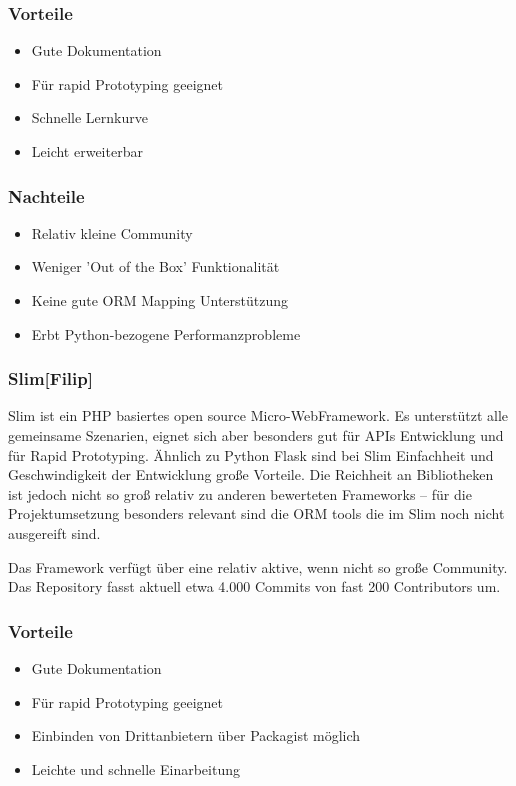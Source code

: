\subsubsection*{Vorteile}
\begin{itemize}
    \item Gute Dokumentation
    \item Für rapid Prototyping geeignet
    \item Schnelle Lernkurve
    \item Leicht erweiterbar
\end{itemize}

\subsubsection*{Nachteile}
\begin{itemize}
    \item Relativ kleine Community
    \item Weniger 'Out of the Box' Funktionalität
    \item Keine gute ORM Mapping Unterstützung
    \item Erbt Python-bezogene Performanzprobleme
\end{itemize}

\subsubsection*{Slim\hfill[Filip]}
Slim ist ein PHP basiertes open source Micro-WebFramework. Es unterstützt alle gemeinsame Szenarien, eignet sich aber besonders gut für APIs Entwicklung und für Rapid Prototyping. Ähnlich zu Python Flask sind bei Slim Einfachheit und Geschwindigkeit der Entwicklung große Vorteile. Die Reichheit an Bibliotheken ist jedoch nicht so groß relativ zu anderen bewerteten Frameworks – für die Projektumsetzung besonders relevant sind die ORM tools die im Slim noch nicht ausgereift sind.

Das Framework verfügt über eine relativ aktive, wenn nicht so große Community. Das Repository fasst aktuell etwa 4.000 Commits von fast 200 Contributors um.
\subsubsection*{Vorteile}
\begin{itemize}
    \item Gute Dokumentation
    \item Für rapid Prototyping geeignet
    \item Einbinden von Drittanbietern über Packagist möglich
    \item Leichte und schnelle Einarbeitung
\end{itemize}

